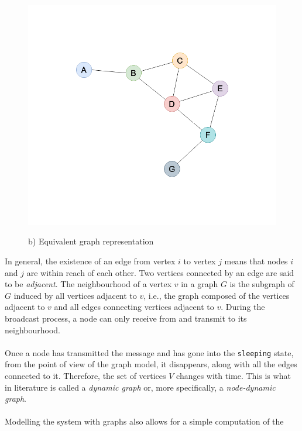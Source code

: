 \begin{figure}[H]
\begin{minipage}{.5\textwidth}
		\includegraphics[scale=.23]{img/wireless_graph_2.png}
		\begin{center}
            b) Equivalent graph representation
        \end{center}
	\end{minipage}
	\caption{}
    \label{fig:graph1}
\end{figure}
\noindent
In general, the existence of an edge from vertex $i$ to vertex $j$ means that
nodes $i$ and $j$ are within reach of each other. Two vertices connected by an
edge are said to be \textit{adjacent}. The neighbourhood of a vertex $v$ in a
graph $G$ is the subgraph of $G$ induced by all vertices adjacent to $v$, i.e.,
the graph composed of the vertices adjacent to $v$ and all edges connecting
vertices adjacent to $v$. During the broadcast process, a node can only receive
from and transmit to its neighbourhood.\\
\\
Once a node has transmitted the message and has gone into the \texttt{sleeping}
state, from the point of view of the graph model, it disappears, along with all
the edges connected to it. Therefore, the set of vertices $V$ changes with time.
This is what in literature is called a \textit{dynamic graph} or, more
specifically, a \textit{node-dynamic graph}\cite{hararygraph}.\\
\\
Modelling the system with graphs also allows for a simple computation of the
